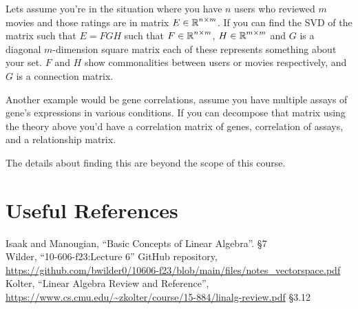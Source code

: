  Lets assume you're in the situation where you have $n$ users who reviewed $m$ movies and those ratings are in matrix $E\in\operatorname{\mathbb{R}}^{n\times m}$. 
 If you can find the SVD of the matrix such that $E=FGH$ such that $F\in\operatorname{\mathbb{R}}^{n\times m}$, $H\in\operatorname{\mathbb{R}}^{m\times m}$ and $G$ is a diagonal $m$-dimension square matrix each of these represents something about your set. 
 $F$ and $H$ show commonalities between users or movies respectively, 
 and $G$ is a connection matrix. 
 
 Another example would be gene correlations, assume you have multiple assays of gene's expressions in various conditions. 
 If you can decompose that matrix using the theory above you'd have a correlation matrix of genes, correlation of assays, and a relationship matrix. 
 
 
 The details about finding this are beyond the scope of this course. 


\section*{Useful References}
Isaak and Manougian, ``Basic Concepts of Linear Algebra''. \S 7\\
Wilder, ``10-606-f23:Lecture 6'' GitHub repository, \url{https://github.com/bwilder0/10606-f23/blob/main/files/notes_vectorspace.pdf}\\
Kolter, ``Linear Algebra Review and Reference'', \url{https://www.cs.cmu.edu/~zkolter/course/15-884/linalg-review.pdf} \S 3.12


